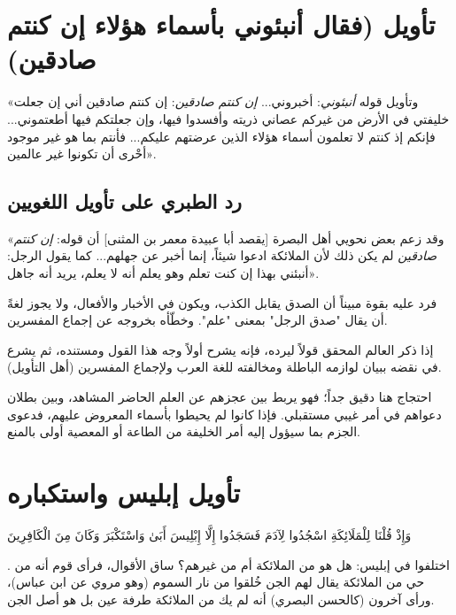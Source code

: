 \separator

\section{تأويل (فقال أنبئوني بأسماء هؤلاء إن كنتم صادقين)}
 «وتأويل قوله \textit{أنبئوني}: أخبروني... \textit{إن كنتم صادقين}: إن كنتم صادقين أني إن جعلت خليفتي في الأرض من غيركم عصاني ذريته وأفسدوا فيها، وإن جعلتكم فيها أطعتموني... فإنكم إذ كنتم لا تعلمون أسماء هؤلاء الذين عرضتهم عليكم... فأنتم بما هو غير موجود أحْرى أن تكونوا غير عالمين».

\subsection{رد الطبري على تأويل اللغويين}
 «وقد زعم بعض نحويي أهل البصرة [يقصد أبا عبيدة معمر بن المثنى] أن قوله: \textit{إن كنتم صادقين} لم يكن ذلك لأن الملائكة ادعوا شيئاً، إنما أخبر عن جهلهم... كما يقول الرجل: أنبئني بهذا إن كنت تعلم وهو يعلم أنه لا يعلم، يريد أنه جاهل».

فرد عليه  بقوة مبيناً أن الصدق يقابل الكذب، ويكون في الأخبار والأفعال، ولا يجوز لغةً أن يقال "صدق الرجل" بمعنى "علم". وخطّأه بخروجه عن إجماع المفسرين.

\begin{fawaid}
إذا ذكر العالم المحقق قولاً ليرده، فإنه يشرح أولاً وجه هذا القول ومستنده، ثم يشرع في نقضه ببيان لوازمه الباطلة ومخالفته للغة العرب ولإجماع المفسرين (أهل التأويل).
\end{fawaid}

\begin{fawaid}
احتجاج  هنا دقيق جداً؛ فهو يربط بين عجزهم عن العلم الحاضر المشاهد، وبين بطلان دعواهم في أمر غيبي مستقبلي. فإذا كانوا لم يحيطوا بأسماء المعروض عليهم، فدعوى الجزم بما سيؤول إليه أمر الخليفة من الطاعة أو المعصية أولى بالمنع.
\end{fawaid}

\separator

\section{تأويل إبليس واستكباره}
 \begin{ayah}وَإِذْ قُلْنَا لِلْمَلَائِكَةِ اسْجُدُوا لِآدَمَ فَسَجَدُوا إِلَّا إِبْلِيسَ أَبَىٰ وَاسْتَكْبَرَ وَكَانَ مِنَ الْكَافِرِينَ\end{ayah}.
اختلفوا في إبليس: هل هو من الملائكة أم من غيرهم؟
ساق  الأقوال، فرأى قوم أنه من حي من الملائكة يقال لهم الجن خُلقوا من نار السموم (وهو مروي عن ابن عباس)، ورأى آخرون (كالحسن البصري) أنه لم يك من الملائكة طرفة عين بل هو أصل الجن.

